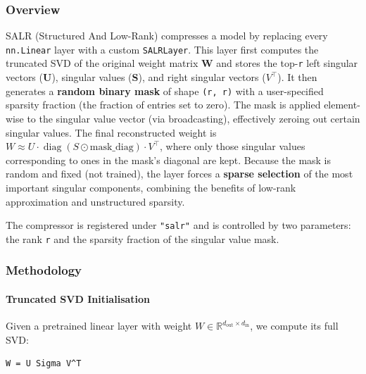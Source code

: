 \subsubsection*{Overview}

SALR (Structured And Low-Rank) compresses a model by replacing every \texttt{nn.Linear} layer with a custom \texttt{SALRLayer}. This layer first computes the truncated SVD of the original weight matrix \textbf{W} and stores the top-\texttt{r} left singular vectors (\textbf{U}), singular values (\textbf{S}), and right singular vectors ($V^\top$). It then generates a \textbf{random binary mask} of shape \texttt{(r, r)} with a user-specified sparsity fraction (the fraction of entries set to zero). The mask is applied element-wise to the singular value vector (via broadcasting), effectively zeroing out certain singular values. The final reconstructed weight is $W \approx U \cdot \operatorname{diag}(S \odot \text{mask\_diag}) \cdot V^\top$, where only those singular values corresponding to ones in the mask's diagonal are kept. Because the mask is random and fixed (not trained), the layer forces a \textbf{sparse selection} of the most important singular components, combining the benefits of low-rank approximation and unstructured sparsity.

The compressor is registered under \texttt{"salr"} and is controlled by two parameters: the rank \texttt{r} and the sparsity fraction of the singular value mask.


\subsubsection*{Methodology}

\paragraph{Truncated SVD Initialisation}

Given a pretrained linear layer with weight $W \in \mathbb{R}^{d_{\text{out}} \times d_{\text{in}}}$, we compute its full SVD:

\vspace{0.5em}
\begin{mdframed}[backgroundcolor=codebg, linecolor=codeframe, linewidth=1pt, roundcorner=4pt, innerleftmargin=2pt, innerrightmargin=5pt, innertopmargin=5pt, innerbottommargin=5pt]
\begin{lstlisting}
W = U Sigma V^T
\end{lstlisting}
\end{mdframed}
\vspace{0.5em}

